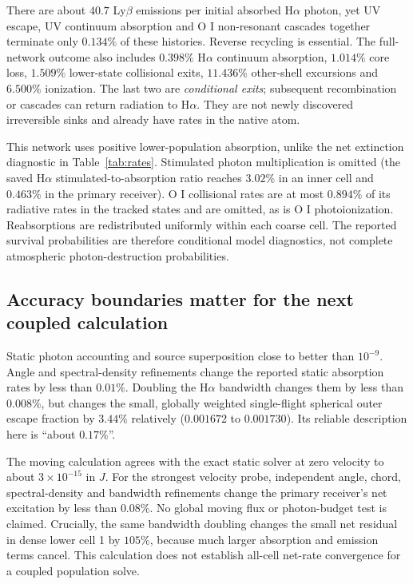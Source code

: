 There are about $40.7$ Ly$\beta$ emissions per initial absorbed H$\alpha$
photon, yet UV escape, UV continuum absorption and O I non-resonant cascades
together terminate only $0.134\%$ of these histories. Reverse recycling is
essential. The full-network outcome also includes $0.398\%$ H$\alpha$
continuum absorption, $1.014\%$ core loss, $1.509\%$ lower-state collisional
exits, $11.436\%$ other-shell excursions and $6.500\%$ ionization.
The last two are \emph{conditional exits}; subsequent recombination or cascades
can return radiation to H$\alpha$. They are not newly discovered irreversible
sinks and already have rates in the native atom.

This network uses positive lower-population absorption, unlike the net
extinction diagnostic in Table~\ref{tab:rates}. Stimulated photon multiplication
is omitted (the saved H$\alpha$ stimulated-to-absorption ratio reaches
$3.02\%$ in an inner cell and $0.463\%$ in the primary receiver).
O I collisional rates are at most $0.894\%$ of its radiative rates in the
tracked states and are omitted, as is O I photoionization.
Reabsorptions are redistributed uniformly within each coarse cell.
The reported survival probabilities are therefore conditional model diagnostics,
not complete atmospheric photon-destruction probabilities.

\subsection{Accuracy boundaries matter for the next coupled calculation}
Static photon accounting and source superposition close to better than
$10^{-9}$. Angle and spectral-density refinements change the reported static
absorption rates by less than $0.01\%$. Doubling the H$\alpha$ bandwidth
changes them by less than $0.008\%$, but changes the small, globally weighted
single-flight spherical outer escape fraction by $3.44\%$ relatively
($0.001672$ to $0.001730$). Its reliable description here is ``about $0.17\%$''.

The moving calculation agrees with the exact static solver at zero velocity
to about $3\times10^{-15}$ in $J$. For the strongest velocity probe, independent
angle, chord, spectral-density and bandwidth refinements change the primary
receiver's net excitation by less than $0.08\%$. No global moving flux or
photon-budget test is claimed. Crucially, the same bandwidth doubling changes
the small net residual in dense lower cell 1 by $105\%$, because much larger
absorption and emission terms cancel. This calculation does not establish
all-cell net-rate convergence for a coupled population solve.

